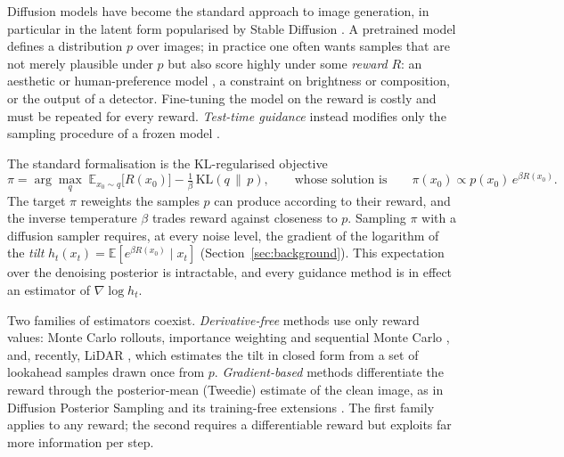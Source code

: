 \documentclass[11pt]{article}
\newcommand{\E}{\mathbb{E}}
\newcommand{\KL}{\mathrm{KL}}
\begin{document}
Diffusion models \citep{ho2020ddpm, song2021ddim, song2021sde} have become the standard approach to image generation, in particular in the latent form popularised by Stable Diffusion \citep{rombach2022ldm}. A pretrained model defines a distribution $p$ over images; in practice one often wants samples that are not merely plausible under $p$ but also score highly under some \emph{reward} $R$: an aesthetic or human-preference model \citep{xu2023imagereward}, a constraint on brightness or composition, or the output of a detector. Fine-tuning the model on the reward \citep{black2024ddpo, clark2024draft} is costly and must be repeated for every reward. \emph{Test-time guidance} instead modifies only the sampling procedure of a frozen model \citep{uehara2025review}.

The standard formalisation is the KL-regularised objective
\begin{equation}
\pi = \arg\max_{q}\; \E_{x_0 \sim q}\big[R(x_0)\big] - \tfrac{1}{\beta}\,\KL(q \,\|\, p),
\qquad\text{whose solution is}\qquad
\pi(x_0) \propto p(x_0)\, e^{\beta R(x_0)} .
\label{eq:target}
\end{equation}
The target $\pi$ reweights the samples $p$ can produce according to their reward, and the inverse temperature $\beta$ trades reward against closeness to $p$. Sampling $\pi$ with a diffusion sampler requires, at every noise level, the gradient of the logarithm of the \emph{tilt} $h_t(x_t)=\E[e^{\beta R(x_0)} \mid x_t]$ (Section~\ref{sec:background}). This expectation over the denoising posterior is intractable, and every guidance method is in effect an estimator of $\nabla \log h_t$.

Two families of estimators coexist. \emph{Derivative-free} methods use only reward values: Monte Carlo rollouts, importance weighting and sequential Monte Carlo \citep{singhal2025fk, li2025svdd}, and, recently, LiDAR \citep{kim2026lidar}, which estimates the tilt in closed form from a set of lookahead samples drawn once from $p$. \emph{Gradient-based} methods differentiate the reward through the posterior-mean (Tweedie) estimate of the clean image, as in Diffusion Posterior Sampling \citep{chung2023dps} and its training-free extensions \citep{bansal2024universal, yu2023freedom}. The first family applies to any reward; the second requires a differentiable reward but exploits far more information per step.
\end{document}
